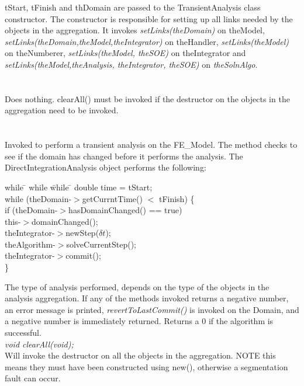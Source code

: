 \p tStart, \p tFinish and \p thDomain are passed to the
TransientAnalysis class constructor. The constructor is responsible
for setting up all links needed by the objects in the aggregation. It
invokes {\em setLinks(theDomain)} on \p theModel, {\em
setLinks(theDomain,theModel,theIntegrator)} on \p theHandler, 
{\em setLinks(theModel)} on \p theNumberer,  {\em
setLinks(theModel, theSOE)} on \p theIntegrator and  {\em
setLinks(theModel,theAnalysis, theIntegrator, theSOE)} on {\em
theSolnAlgo}. \\

 \\
\\ 
Does nothing. clearAll() must be invoked if the destructor on
the objects in the aggregation need to be invoked. \\

\\
 \\
Invoked to perform a transient analysis on the FE\_Model. The method
checks to see if the domain has changed before it performs the
analysis. The DirectIntegrationAnalysis object performs the following:
\begin{tabbing}
while \= \+ while \= while \= \kill
    double time = tStart; \\
    while (theDomain-$>$getCurrntTime() $<$ tFinish) \{ \+ \\
       if (theDomain-$>$hasDomainChanged() == true) \+\\
           this-$>$domainChanged(); \- \\

	theIntegrator-$>$newStep($\delta t$); \\
	theAlgorithm-$>$solveCurrentStep(); \\
        theIntegrator-$>$commit(); \- \\
    \}
\end{tabbing}
\noindent The type of analysis performed, depends on the type of the
objects in the analysis aggregation. If any of the methods invoked
returns a negative number, an error message is printed, {\em
revertToLastCommit()} is invoked on the Domain, and a negative number
is immediately returned. Returns a $0$ if the algorithm is successful. \\

{\em void clearAll(void);} \\
Will invoke the destructor on all the objects in the aggregation. NOTE
this means they must have been constructed using new(),
otherwise a segmentation fault can occur.\\

